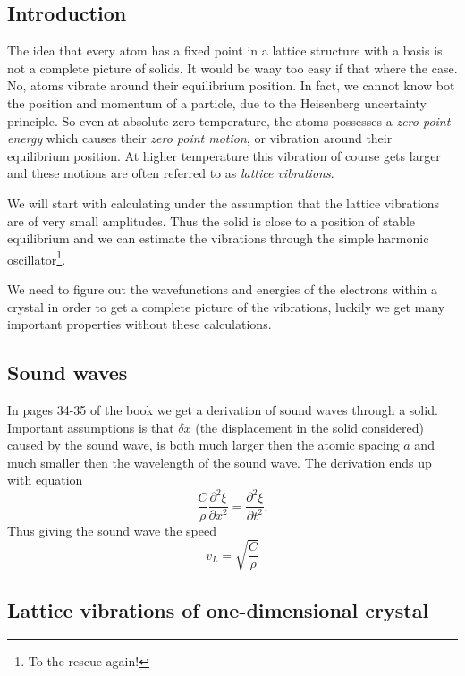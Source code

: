 \documentclass[11pt]{article}
\begin{document}
\subsection{Introduction}
The idea that every atom has a fixed point in a lattice structure with a basis is not a complete picture of solids. It would be waay too easy if that where the case. No, atoms vibrate around their equilibrium position. In fact, we cannot know bot the position and momentum of a particle, due to the Heisenberg uncertainty principle. So even at absolute zero temperature, the atoms possesses a \emph{zero point energy} which causes their \emph{zero point motion}, or vibration around their equilibrium position. At higher temperature this vibration of course gets larger and these motions are often referred to as \emph{lattice vibrations}. 

We will start with calculating under the assumption that the lattice vibrations are of very small amplitudes. Thus the solid is close to a position of stable equilibrium and we can estimate the vibrations through the simple harmonic oscillator\footnote{To the rescue again!}.

We need to figure out the wavefunctions and energies of the electrons within a crystal in order to get a complete picture of the vibrations, luckily we get many important properties without these calculations.
\subsection{Sound waves}
In pages 34-35 of the book we get a derivation of sound waves through a solid. Important assumptions is that $\delta x$ (the displacement in the solid considered) caused by the sound wave, is both much larger then the atomic spacing $a$ and much smaller then the wavelength of the sound wave. The derivation ends up with equation
\begin{equation}
	\frac{C}{\rho} \frac{\partial^2 \xi}{\partial x^2} = \frac{\partial^2 \xi}{\partial t^2}.
\end{equation}
Thus giving the sound wave the speed
\begin{equation}
	v_L = \sqrt{\frac{C}{\rho}}
\end{equation}

\subsection{Lattice vibrations of one-dimensional crystal}
\end{document}
